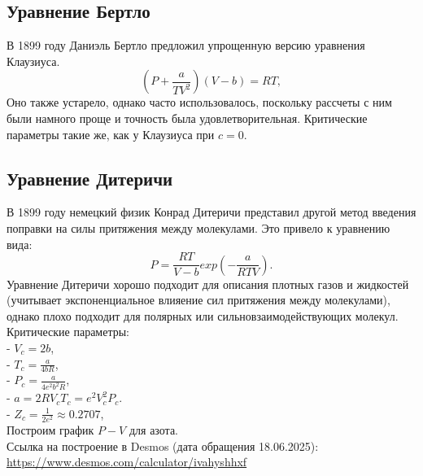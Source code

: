 \documentclass[a4paper]{article}
\numberwithin{equation}{subsection} %
\begin{document}
\subsection{Уравнение Бертло}
В 1899 году Даниэль Бертло предложил упрощенную версию уравнения Клаузиуса.
\begin{equation}
      (P + \frac{a}{TV^2})(V - b) = RT,
\tag{\thesubsection}
\end{equation}
Оно также устарело, однако часто использовалось, поскольку рассчеты с ним были намного проще и точность была удовлетворительная. Критические параметры такие же, как у Клаузиуса при $c = 0$.

\subsection{Уравнение Дитеричи}
В 1899 году немецкий физик Конрад Дитеричи представил другой метод введения поправки на силы притяжения между молекулами. Это привело к уравнению вида:
\begin{equation}
      P = \frac{RT}{V-b}exp\left( -\frac{a}{RTV}\right).
\tag{\thesubsection}
\end{equation}
Уравнение Дитеричи хорошо подходит для описания плотных газов и жидкостей (учитывает экспоненциальное влияение сил притяжения между молекулами), однако плохо подходит для полярных или сильновзаимодействующих молекул.
Критические параметры:\\
- $V_c = 2b$,\\
- $T_c = \frac{a}{4bR}$,\\
- $P_c = \frac{a}{4e^2b^2R}$,\\
- $a = 2RV_cT_c = e^2V_c^2P_c$.\\
- $Z_c = \frac{1}{2e^2} \approx 0.2707$,\\
Построим график $P-V$ для азота.\\
Ссылка на построение в Desmos (дата обращения 18.06.2025): \href{https://www.desmos.com/calculator/ivahyshhxf}{https://www.desmos.com/calculator/ivahyshhxf}
\clearpage
\end{document}
